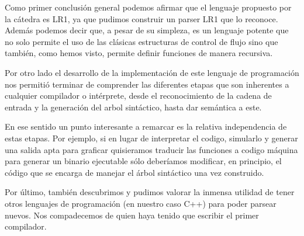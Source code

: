 Como primer conclusión general podemos afirmar que el lenguaje propuesto por la cátedra es LR1, ya que pudimos construir un parser LR1 que lo reconoce. Además podemos decir que, a pesar de su simpleza, es un lenguaje potente que no solo permite el uso de las clásicas estructuras de control de flujo sino que también, como hemos visto, permite definir funciones de manera recursiva.

Por otro lado el desarrollo de la implementación de este lenguaje de programación nos permitió terminar de comprender las diferentes etapas que son inherentes a cualquier compilador o intérprete, desde el reconocimiento de la cadena de entrada y la generación del arbol sintáctico, hasta dar semántica a este. 

En ese sentido un punto interesante a remarcar es la relativa independencia de estas etapas. Por ejemplo, si en lugar de interpretar el codigo, simularlo y generar una salida apta para graficar quisieramos traducir las funciones a codigo máquina para generar un binario ejecutable sólo deberíamos modificar, en principio, el código que se encarga de manejar el árbol sintáctico una vez construido.

Por último, también descubrimos y pudimos valorar la inmensa utilidad de tener otros lenguajes de programación (en nuestro caso C++) para poder parsear nuevos. Nos compadecemos de quien haya tenido que escribir el primer compilador.